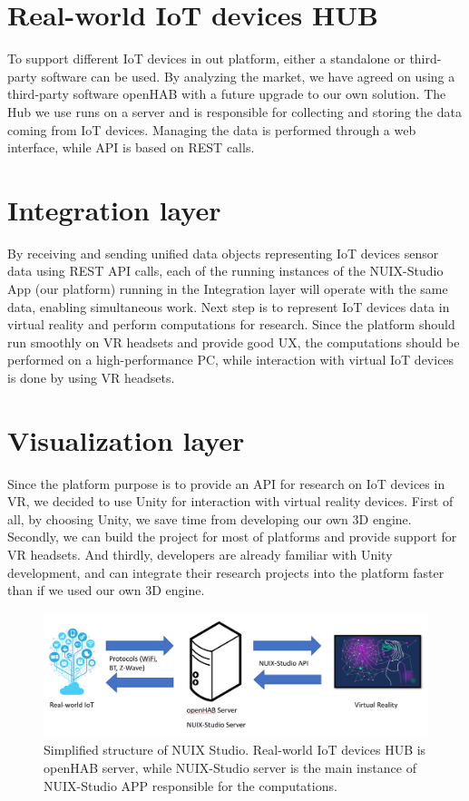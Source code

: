 \section{Real-world IoT devices HUB}
To support different IoT devices in out platform, either a standalone or third-party software can be used. By analyzing the market, we have agreed on using a third-party software openHAB with a future upgrade to our own solution. The Hub we use runs on a server and is responsible for collecting and storing the data coming from IoT devices. Managing the data is performed through a web interface, while API is based on REST calls.

\section{Integration layer}
By receiving and sending unified data objects representing IoT devices sensor data using REST API calls, each of the running instances of the NUIX-Studio App (our platform) running in the Integration layer will operate with the same data, enabling simultaneous work.
Next step is to represent IoT devices data in virtual reality and perform computations for research. Since the platform should run smoothly on VR headsets and provide good UX, the computations should be performed on a high-performance PC, while interaction with virtual IoT devices is done by using VR headsets. 

\section{Visualization layer}
Since the platform purpose is to provide an API for research on IoT devices in VR, we decided to use Unity for interaction with virtual reality devices. First of all, by choosing Unity, we save time from developing our own 3D engine. Secondly, we can build the project for most of platforms and provide support for VR headsets. And thirdly, developers are already familiar with Unity development, and can integrate their research projects into the platform faster than if we used our own 3D engine.

\begin{figure}
  \centering
  \includegraphics[width=0.6\linewidth]{figures/BasicPlatformStructure.png}
  \caption{Simplified structure of NUIX Studio. Real-world IoT devices HUB is openHAB server, while NUIX-Studio server is the main instance of NUIX-Studio APP responsible for the computations.}
  \label{fig:BasicPlatformStructure-figure}
\end{figure}

